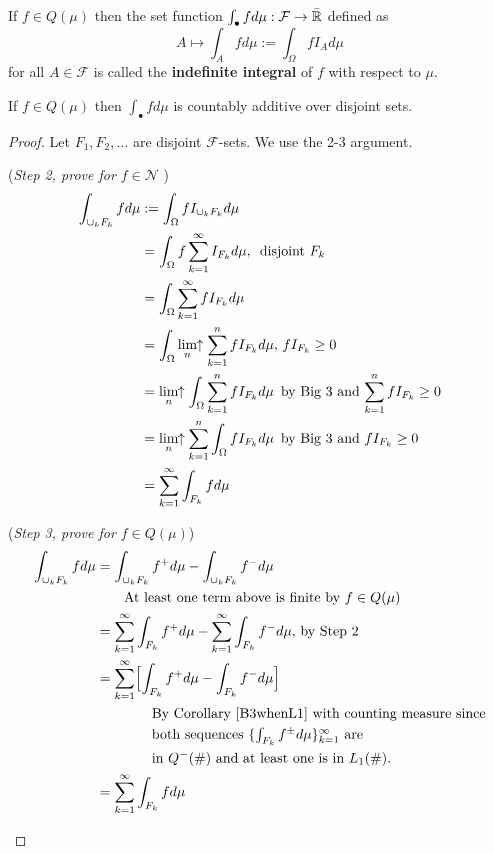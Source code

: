 \begin{definition}
If $f\in  Q(\mu)$ then the set function $\int_\bullet fd\mu: \mathcal F\rightarrow \bar{\Bbb R}$ defined as
\[A\mapsto \int_A fd\mu:= \int_\Omega f I_A d\mu\]
for all $A\in \mathcal F$ is called the {\bf indefinite integral} of $f$ with respect to $\mu$.
\end{definition}

\begin{theorem} If $f\in Q(\mu)$ then $\int_\bullet fd\mu$ is countably additive over disjoint sets.
\end{theorem}

\begin{proof}
Let $F_1, F_2, \ldots$ are disjoint $\mathcal F$-sets. We use the 2-3 argument.

\begin{flushleft}
({\sl Step 2, prove for $f\in \mathscr N$ })
\begin{align*}
\int_{\cup_k F_k} fd\mu
&:= \int_{\Omega} f I_{\cup_k F_k} d\mu \\
&= \int_{\Omega} f \sum_{k=1}^\infty I_{F_k} d\mu,\,\text{ disjoint $F_k$} \\
&= \int_{\Omega} \sum_{k=1}^\infty f I_{F_k} d\mu \\
&= \int_{\Omega} \displaystyle\lim_{n}\!\!\uparrow\sum_{k=1}^n f I_{ F_k} d\mu,\,\text{$f I_{ F_k}\geq 0$}\\
&= \displaystyle\lim_{n}\!\!\uparrow \int_{\Omega} \sum_{k=1}^n f I_{ F_k} d\mu\,\text{ by Big 3 and $\sum_{k=1}^n f I_{ F_k}\geq 0$} \\
&= \displaystyle\lim_{n}\!\!\uparrow \sum_{k=1}^n \int_{\Omega}  f I_{ F_k} d\mu\,\text{ by Big 3 and $f I_{ F_k}\geq 0$} \\
&=  \sum_{k=1}^\infty \int_{F_k}fd\mu
\end{align*}
\end{flushleft}

\begin{flushleft}
({\sl Step 3, prove for $f\in Q(\mu)$})
\begin{align*}
\int_{\cup_k F_k} fd\mu
&= \int_{\cup_k F_k} f^+d\mu  - \int_{\cup_k F_k} f^-d\mu  \\
& \qquad\text{At least one term above is finite by $f\in Q(\mu)$}  \\
&= \sum_{k=1}^\infty \int_{F_k} f^+d\mu - \sum_{k=1}^\infty \int_{F_k} f^-d\mu,\,\text{by Step 2}\\
& = \sum_{k=1}^\infty \Bigl[\int_{F_k} f^+d\mu -  \int_{F_k} f^-d\mu\Bigr] \\
& \qquad\qquad\text{By Corollary \ref{B3whenL1} with counting measure since}  \\
& \qquad\qquad\text{both sequences $\{\textstyle\int_{F_k} f^\pm d\mu \}_{k=1}^\infty$ are }  \\
& \qquad\qquad\text{in $Q^-(\#)$ and at least one is in  $L_1(\#)$.} \\
& = \sum_{k=1}^\infty \int_{F_k} fd\mu
\end{align*}
\end{flushleft}


\end{proof}



